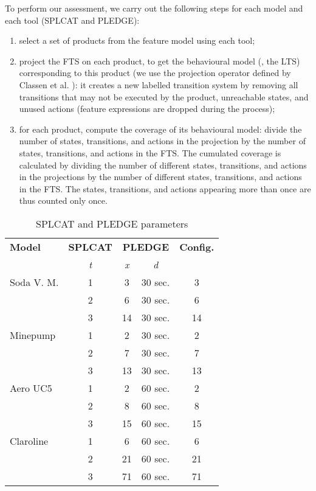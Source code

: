 To perform our assessment, we carry out the following steps for each model and each tool (SPLCAT and PLEDGE):
\begin{enumerate}
\item select a set of products from the feature model using each tool;
\item project the FTS on each product, to get the behavioural model (\ie, the LTS) corresponding to this product (we use the projection operator defined by Classen et al. \cite{Classen2013b}): it creates a new labelled transition system by removing all transitions that may not be executed by the product, unreachable states, and unused actions (feature expressions are dropped during the process);
\item for each product, compute the coverage of its behavioural model: divide the number of states, transitions, and actions in the projection by the number of states, transitions, and actions in the FTS. The cumulated coverage is calculated by dividing the number of different states, transitions, and actions in the projections by the number of different states, transitions, and actions in the FTS. The states, transitions, and actions appearing more than once are thus counted only once.
\end{enumerate}

\begin{table}
\centering
\caption{SPLCAT and PLEDGE parameters}
\label{tab:behavcov:toolsparams}
\begin{small}
\begin{tabular}{lcccc}
\hline
\textbf{Model}	& \textbf{SPLCAT} 	& \multicolumn{2}{c}{\textbf{PLEDGE}}& \textbf{Config.}  \\
				& \textit{t}	& \textit{x}		& \textit{d}		&  \\
\hline
Soda V. M.		& 1				& 3			& 30 sec.		& 3				\\
				& 2				& 6			& 30 sec.		& 6				\\
				& 3				& 14			& 30 sec.		& 14				\\
Minepump			& 1				& 2			& 30 sec.		& 2				\\
				& 2				& 7			& 30 sec.		& 7				\\
				& 3				& 13			& 30 sec.		& 13				\\
Aero UC5			& 1				& 2			& 60 sec.		& 2				\\
				& 2				& 8			& 60 sec.		& 8				\\
				& 3				& 15			& 60 sec.		& 15				\\
Claroline		& 1				& 6			& 60 sec.		& 6				\\
				& 2				& 21			& 60 sec.		& 21				\\
				& 3				& 71			& 60 sec.		& 71				\\
\hline
\end{tabular}
\end{small}
\end{table}


